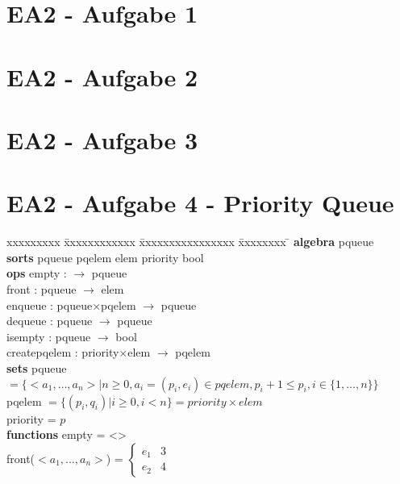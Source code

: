 \documentclass[12pt]{article}
\newcommand{\M}{$\times$}
\newcommand{\rA}{$\rightarrow $ }
\begin{document}
\section*{EA2 - Aufgabe 1}
\section*{EA2 - Aufgabe 2}
\section*{EA2 - Aufgabe 3}
\section*{EA2 - Aufgabe 4 - Priority Queue} 
\begin{tabbing}
xxxxxxxxx \= xxxxxxxxxxxx \= xxxxxxxxxxxxxxxx \= xxxxxxxx \= \kill
\textbf{algebra} \> pqueue \\
\textbf{sorts}  \> pqueue pqelem elem priority bool \\
\textbf{ops}    \> empty        \> :                        \> \rA  pqueue \\
                \> front        \> : pqueue                 \> \rA elem \\
                \> enqueue      \> : pqueue\M pqelem    \> \rA pqueue \\ 
                \> dequeue      \> : pqueue                 \> \rA pqueue \\
                \> isempty      \> : pqueue                 \> \rA bool \\
                \> createpqelem \> : priority\M elem        \> \rA pqelem \\
\textbf{sets}   \> pqueue \> $= \{<a_1, \dots , a_n>|n \ge 0, a_i = (p_i, e_i) \in pqelem, p_i + 1 \le p_i, i \in \{1, \dots, n\} \}$ \\
                \> pqelem \> $= \{(p_i, q_i)|i \ge 0, i < n\}   = priority \times elem $ \\
                \> priority \> = $p$ \\
\textbf{functions} \> empty \>                      \> = <> \\
                \> front($<a_1, \dots , a_n>$) \>   \> = $\begin{cases} e_1 & 3 \\ e_2 & 4 \end{cases}$ \\
\end{tabbing}
\end{document}
